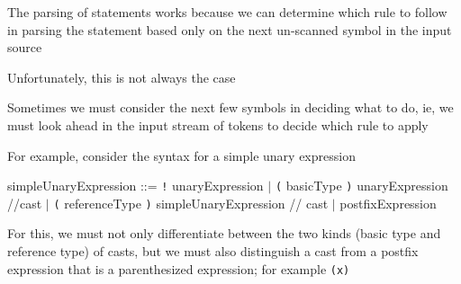 \documentclass[8pt,a4paper,compress,handout]{beamer}
\newcommand{\mm}[1]{$#1$}
\newenvironment{spaced}
{
\smallskip
\hspace{.5cm}
\begin{minipage}[c]{\textwidth}
}
{
\end{minipage}
\smallskip
}
\begin{document}
\begin{frame}[fragile]
\pause

The parsing of statements works because we can determine which rule to follow in parsing the statement based only on the next un-scanned symbol in the input source

\pause
\bigskip

Unfortunately, this is not always the case

\pause
\bigskip

Sometimes we must consider the next few symbols in deciding what to do, ie, we must look ahead in the input stream of tokens to decide which rule to apply

\pause
\bigskip

For example, consider the syntax for a simple unary expression

\text{ }
\begin{spaced}
\begin{production}
simpleUnaryExpression ::= \lstinline{!} unaryExpression
                                   \mm{|} \lstinline{(} basicType \lstinline{)}  unaryExpression //cast
                                   \mm{|} \lstinline{(} referenceType \lstinline{)} simpleUnaryExpression // cast
                                   \mm{|} postfixExpression
\end{production}
\end{spaced}

\pause
\bigskip

For this, we must not only differentiate between the two kinds (basic type and reference type) of casts, but we must also distinguish a cast from a postfix expression that is a parenthesized expression; for example \lstinline{(x)}
\end{frame}
\end{document}
